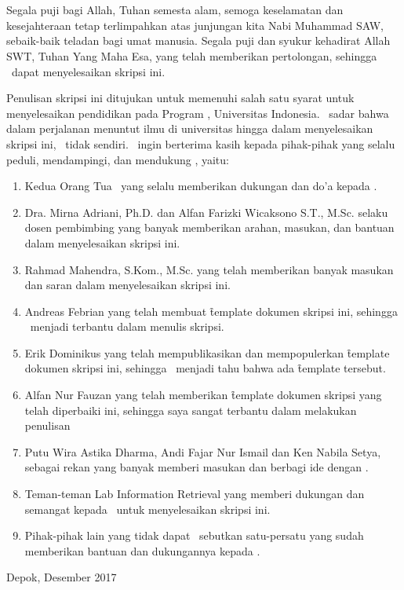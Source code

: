 \chapter*{\kataPengantar}

Segala puji bagi Allah, Tuhan semesta alam, semoga keselamatan dan kesejahteraan tetap terlimpahkan atas junjungan kita Nabi Muhammad SAW, sebaik-baik teladan bagi umat manusia. Segala puji dan syukur kehadirat Allah SWT, Tuhan Yang Maha Esa, yang telah memberikan pertolongan, sehingga \saya~dapat menyelesaikan skripsi ini.

Penulisan skripsi ini ditujukan untuk memenuhi salah satu syarat untuk menyelesaikan pendidikan pada Program \gelar, Universitas Indonesia. \Saya~sadar bahwa dalam perjalanan menuntut ilmu di universitas hingga dalam menyelesaikan skripsi ini, \saya~tidak sendiri. \Saya~ingin berterima kasih kepada pihak-pihak yang selalu peduli, mendampingi, dan mendukung \saya, yaitu:

\begin{enumerate}
	\item Kedua Orang Tua \saya~yang selalu memberikan dukungan dan do'a kepada \saya.
	\item Dra. Mirna Adriani, Ph.D. dan Alfan Farizki Wicaksono S.T., M.Sc. selaku dosen pembimbing yang banyak memberikan arahan, masukan, dan bantuan dalam menyelesaikan skripsi ini.
  \item Rahmad Mahendra, S.Kom., M.Sc. yang telah memberikan banyak masukan dan saran dalam menyelesaikan skripsi ini.
  \item Andreas Febrian yang telah membuat \f{template} dokumen skripsi ini, sehingga \saya~menjadi terbantu dalam menulis skripsi.
  \item Erik Dominikus yang telah mempublikasikan dan mempopulerkan \f{template} dokumen skripsi ini, sehingga \saya~menjadi tahu bahwa ada \f{template} tersebut.
  \item Alfan Nur Fauzan yang telah memberikan \f{template} dokumen skripsi yang telah diperbaiki ini, sehingga saya sangat terbantu dalam melakukan penulisan
	\item Putu Wira Astika Dharma, Andi Fajar Nur Ismail dan Ken Nabila Setya, sebagai rekan yang banyak memberi masukan dan berbagi ide dengan \saya.
  \item Teman-teman Lab Information Retrieval yang memberi dukungan dan semangat kepada \saya~untuk menyelesaikan skripsi ini.
	\item Pihak-pihak lain yang tidak dapat \saya~sebutkan satu-persatu yang sudah memberikan bantuan dan dukungannya kepada \saya.
\end{enumerate}
\vspace*{0.1cm}
\begin{flushright}
Depok, Desember 2017\\[0.1cm]
\vspace*{1cm}
\penulis

\end{flushright}